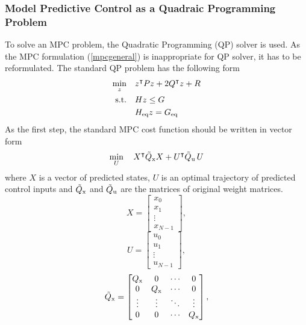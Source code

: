 \subsubsection{Model Predictive Control as a Quadraic Programming Problem}
To solve an MPC problem, the Quadratic Programming (QP) solver is used. As the MPC formulation (\ref{mpcgeneral}) is inappropriate for QP solver, it has to be reformulated. The standard QP problem has the following form
\begin{subequations}
	\begin{align}
	\min_{z}\quad & z^\intercal Pz + 2Q^\intercal z + R\\
	\label{cst_qp}\text{s.t.}\quad&Hz\leq G\\
	&H _{\text{eq}}z = G _{\text{eq}}
	\end{align}
\end{subequations}
As the first step, the standard MPC cost function should be written in vector form
\begin{equation}
	\min_{U}\quad X^\intercal\tilde{Q} _{\text{x}}X + U^\intercal\tilde{Q} _{\text{u}}\,U\\
\end{equation}
where $X$ is a vector of predicted states, $U$ is an optimal trajectory of predicted control inputs and $\tilde{Q} _{\text{x}}$ and $\tilde{Q} _{\text{u}}$ are the matrices of original weight matrices.
\begin{equation}
	X = \begin{bmatrix}
	x_0\\x_{1}\\\vdots\\x_{N-1}
		\end{bmatrix},
\end{equation}
\begin{equation}
U = \begin{bmatrix}
u_0\\u_{1}\\\vdots\\u_{N-1}
\end{bmatrix},
\end{equation}
\begin{equation}
\tilde{Q} _{\text{x}} = \begin{bmatrix}
Q _{\text{x}}&0&\cdots&0\\
0&Q _{\text{x}}&\cdots&0\\
\vdots&\vdots&\ddots&\vdots\\
0&0&\cdots&Q _{\text{x}}
\end{bmatrix},
\end{equation}
